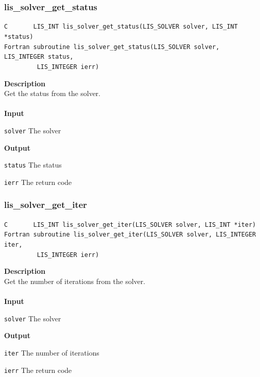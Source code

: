 \documentclass[a4paper]{article}
\newcommand{\namelistlabel}[1]{\mbox{#1}\hfill}
\newenvironment{namelist}[1]{%
\begin{list}{}
  {\let\makelabel\namelistlabel
  \settowidth{\labelwidth}{#1}
  \setlength{\leftmargin}{1.1\labelwidth}}
  }{%
\end{list}}
\begin{document}
\subsubsection{lis\_solver\_get\_status}
\begin{screen}
\verb|C       LIS_INT lis_solver_get_status(LIS_SOLVER solver, LIS_INT *status)|\\
\verb|Fortran subroutine lis_solver_get_status(LIS_SOLVER solver, LIS_INTEGER status,|\\
\verb|         LIS_INTEGER ierr)|
\end{screen}
{\bf Description}\\
\indent
Get the status from the solver.
\\ \\
\noindent
{\bf Input}
\begin{namelist}{XXXXXXXXXXXXXXXXXXXX}
\item[\tt solver] The solver
\end{namelist}
{\bf Output}
\begin{namelist}{XXXXXXXXXXXXXXXXXXXX}
\item[\tt status] The status
\item[\tt ierr] The return code
\end{namelist}

\subsubsection{lis\_solver\_get\_iter}
\begin{screen}
\verb|C       LIS_INT lis_solver_get_iter(LIS_SOLVER solver, LIS_INT *iter)|\\
\verb|Fortran subroutine lis_solver_get_iter(LIS_SOLVER solver, LIS_INTEGER iter,|\\
\verb|         LIS_INTEGER ierr)|
\end{screen}
{\bf Description}\\
\indent
Get the number of iterations from the solver.
\\ \\
\noindent
{\bf Input}
\begin{namelist}{XXXXXXXXXXXXXXXXXXXX}
\item[\tt solver] The solver
\end{namelist}
{\bf Output}
\begin{namelist}{XXXXXXXXXXXXXXXXXXXX}
\item[\tt iter] The number of iterations
\item[\tt ierr] The return code
\end{namelist}
\end{document}
